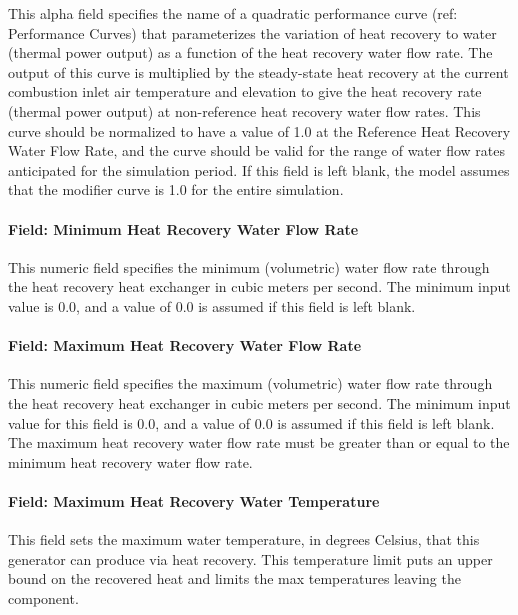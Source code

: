 This alpha field specifies the name of a quadratic performance curve (ref: Performance Curves) that parameterizes the variation of heat recovery to water (thermal power output) as a function of the heat recovery water flow rate. The output of this curve is multiplied by the steady-state heat recovery at the current combustion inlet air temperature and elevation to give the heat recovery rate (thermal power output) at non-reference heat recovery water flow rates. This curve should be normalized to have a value of 1.0 at the Reference Heat Recovery Water Flow Rate, and the curve should be valid for the range of water flow rates anticipated for the simulation period. If this field is left blank, the model assumes that the modifier curve is 1.0 for the entire simulation.

\paragraph{Field: Minimum Heat Recovery Water Flow Rate}\label{field-minimum-heat-recovery-water-flow-rate}

This numeric field specifies the minimum (volumetric) water flow rate through the heat recovery heat exchanger in cubic meters per second. The minimum input value is 0.0, and a value of 0.0 is assumed if this field is left blank.

\paragraph{Field: Maximum Heat Recovery Water Flow Rate}\label{field-maximum-heat-recovery-water-flow-rate}

This numeric field specifies the maximum (volumetric) water flow rate through the heat recovery heat exchanger in cubic meters per second. The minimum input value for this field is 0.0, and a value of 0.0 is assumed if this field is left blank. The maximum heat recovery water flow rate must be greater than or equal to the minimum heat recovery water flow rate.

\paragraph{Field: Maximum Heat Recovery Water Temperature}\label{field-maximum-heat-recovery-water-temperature}

This field sets the maximum water temperature, in degrees Celsius, that this generator can produce via heat recovery. This temperature limit puts an upper bound on the recovered heat and limits the max temperatures leaving the component.

